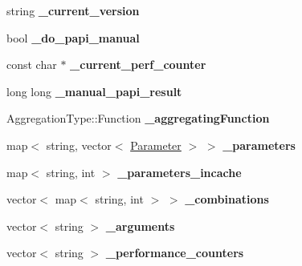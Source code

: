 \begin{DoxyCompactItemize}
\item 
\hypertarget{classAbstractBenchmark_a1fd0f5a922a9357216bbc43edd422ae4}{string {\bfseries \-\_\-current\-\_\-version}}\label{classAbstractBenchmark_a1fd0f5a922a9357216bbc43edd422ae4}

\item 
\hypertarget{classAbstractBenchmark_abdb6c7832016e63793246d3415411248}{bool {\bfseries \-\_\-do\-\_\-papi\-\_\-manual}}\label{classAbstractBenchmark_abdb6c7832016e63793246d3415411248}

\item 
\hypertarget{classAbstractBenchmark_ab528a9f07d437f72f1b019a1ab244966}{const char $\ast$ {\bfseries \-\_\-current\-\_\-perf\-\_\-counter}}\label{classAbstractBenchmark_ab528a9f07d437f72f1b019a1ab244966}

\item 
\hypertarget{classAbstractBenchmark_aa0795bcbef23782d40e034985566d73e}{long long {\bfseries \-\_\-manual\-\_\-papi\-\_\-result}}\label{classAbstractBenchmark_aa0795bcbef23782d40e034985566d73e}

\item 
\hypertarget{classAbstractBenchmark_a60bb7b96f21140fda2f429d728586be5}{Aggregation\-Type\-::\-Function {\bfseries \-\_\-aggregating\-Function}}\label{classAbstractBenchmark_a60bb7b96f21140fda2f429d728586be5}

\item 
\hypertarget{classAbstractBenchmark_ac52d185eb047deb6eb4625ab51eefd13}{map$<$ string, vector$<$ \hyperlink{classParameter}{Parameter} $>$ $>$ {\bfseries \-\_\-parameters}}\label{classAbstractBenchmark_ac52d185eb047deb6eb4625ab51eefd13}

\item 
\hypertarget{classAbstractBenchmark_a371f8b5c0a85eb5f5eb6c2891583597f}{map$<$ string, int $>$ {\bfseries \-\_\-parameters\-\_\-incache}}\label{classAbstractBenchmark_a371f8b5c0a85eb5f5eb6c2891583597f}

\item 
\hypertarget{classAbstractBenchmark_a69b9976921d890b487d24cdd676a08ba}{vector$<$ map$<$ string, int $>$ $>$ {\bfseries \-\_\-combinations}}\label{classAbstractBenchmark_a69b9976921d890b487d24cdd676a08ba}

\item 
\hypertarget{classAbstractBenchmark_a712bca2b6f9bf3ffb7cb0162a90f7ab0}{vector$<$ string $>$ {\bfseries \-\_\-arguments}}\label{classAbstractBenchmark_a712bca2b6f9bf3ffb7cb0162a90f7ab0}

\item 
\hypertarget{classAbstractBenchmark_a7426efa583c2d14f49da2a4f7696a308}{vector$<$ string $>$ {\bfseries \-\_\-performance\-\_\-counters}}\label{classAbstractBenchmark_a7426efa583c2d14f49da2a4f7696a308}


\end{DoxyCompactItemize}
